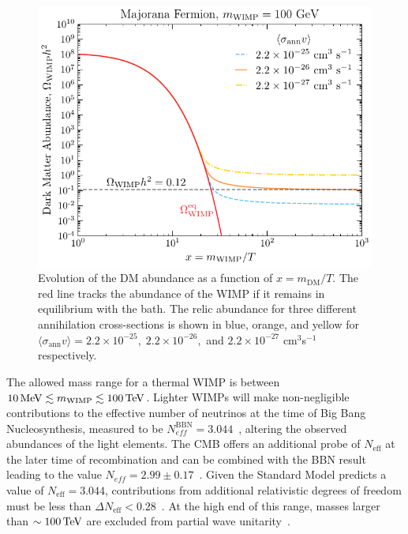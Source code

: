 \begin{figure}[t!]
    \centering
    \includegraphics{fig_dm_freezeout.pdf}
    \caption[Evolution of the DM abundance as a function of $x = m_\mathrm{DM}/T$.]{Evolution of the DM abundance as a function of $x = m_\mathrm{DM}/T$. The red line tracks the abundance of the WIMP if it remains in equilibrium with the bath. The relic abundance for three different annihilation cross-sections is shown in blue, orange, and yellow for $\langle \sigma_\mathrm{ann} v\rangle = 2.2\times10^{-25},\;2.2\times10^{-26},$ and $2.2\times10^{-27}$ cm$^{3}$s$^{-1}$ respectively.}
    \label{ch1:fig:WIMP_freezeout}
\end{figure}

The allowed mass range for a thermal WIMP is between $10{\rm \,MeV}\lesssim m_\mathrm{WIMP} \lesssim 100{\rm \,TeV}$. Lighter WIMPs will make non-negligible contributions to the effective number of neutrinos at the time of Big Bang Nucleosynthesis, measured to be $N^\mathrm{BBN}_{eff} = 3.044$~\cite{Yeh:2022heq_oct_Probingphysicsstandard}, altering the observed abundances of the light elements. The CMB offers an additional probe of $N_\mathrm{eff}$ at the later time of recombination and can be combined with the BBN result leading to the value $N_{eff} = 2.99 \pm 0.17$~\cite{Planck:2018vyg_sep_Planck2018results}. Given the Standard Model predicts a value of $N_\mathrm{eff} = 3.044$, contributions from additional relativistic degrees of freedom must be less than $\Delta N_\mathrm{eff} < 0.28$~\cite{Yeh:2022heq_oct_Probingphysicsstandard}.  
At the high end of this range, masses larger than $\sim 100{\rm \,TeV}$ are excluded from partial wave unitarity~\cite{Griest:1989wd_UnitarityLimitsMass}. 
 

